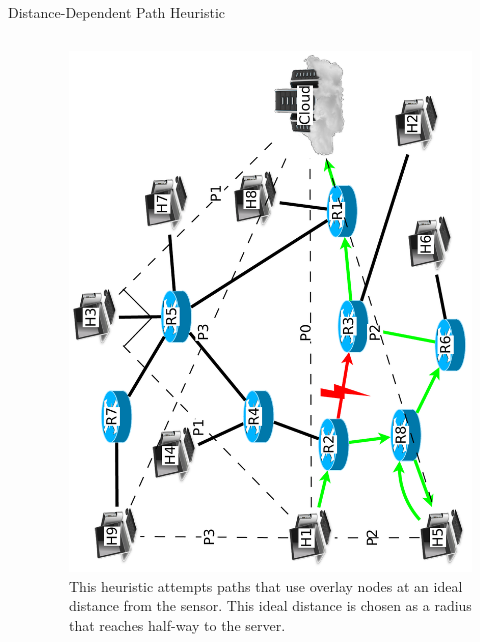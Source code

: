 \documentclass[pdftex]{beamer}
\begin{document}

\begin{frame}{Distance-Dependent Path Heuristic}
\begin{columns}
\begin{column}{.5\textwidth}
\begin{algorithm}[H]
\DontPrintSemicolon
{}
\SetAlgoLined
\SetAlgoLongEnd
\scriptsize
\caption{Distance-Dependent Path Heuristic Algorithms}
\small
\end{algorithm}
\end{column}
	
\begin{column}{.5\textwidth}
\begin{figure}
\includegraphics[height=\textwidth,angle=-90]{new_angle}
\caption{This heuristic attempts paths that use overlay nodes at an ideal distance from the sensor.  This ideal distance is chosen as a radius that reaches half-way to the server.}
\end{figure}
\end{column}

\end{columns}
\end{frame}
\end{document}
